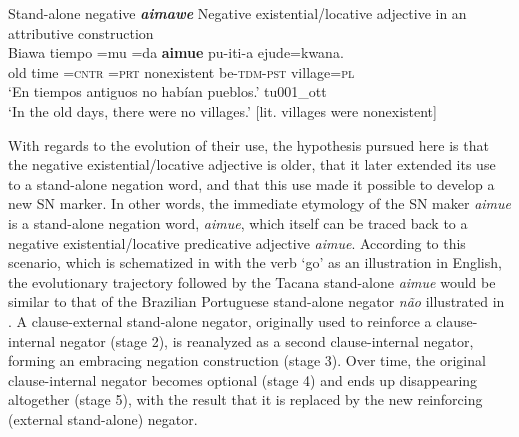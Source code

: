 \documentclass[output=paper,draft,draftmode,colorlinks,citecolor=brown]{langscibook}
\begin{document}
\begin{exe}\ex
\label{ex:tacana-standalone-negative}  Stand-alone negative
\textbf{\textit{aimawe}}
%
\ex\label{ex:tacana-negexadj} Negative existential\slash locative adjective
in an attributive construction\\
\gll {\ob}Biawa tiempo{\cb} =mu =da \textbf{aimue} pu-iti-a ejude=kwana.\\
    old  time  =\textsc{cntr}  \textsc{=prt}  nonexistent
    be-\textsc{tdm-pst}  village=\textsc{pl}\\
\glt `En tiempos antiguos no habían pueblos.' tu001\_ott \citep[8--9]{Ottaviano1989}\\
`In the old days, there were no villages.' [lit. villages were nonexistent]
\end{exe}

With regards to the evolution of their use, the hypothesis pursued
here is that the negative existential\slash locative adjective is older,
that it later extended its use to a stand-alone negation word, and that
this use made it possible to develop a new SN marker. In other words, the
immediate etymology of the SN maker \textit{aimue} is a stand-alone
negation word, \textit{aimue}, which itself can be traced back to a
negative existential\slash locative predicative adjective \textit{aimue}.
According to this scenario, which is schematized in
 with the verb `go' as an illustration in
English, the evolutionary trajectory followed by the Tacana stand-alone
\textit{aimue} would be similar to that of the Brazilian
Portuguese
stand-alone negator \textit{não} illustrated in .
A clause-external stand-alone negator, originally used to reinforce a
clause-internal negator (stage 2), is reanalyzed as a second
clause-internal negator, forming an embracing negation construction (stage
3). Over time, the original clause-internal negator becomes optional (stage
4) and ends up disappearing altogether (stage 5), with the result that it
is replaced by the new reinforcing (external stand-alone)
negator.
\end{document}
